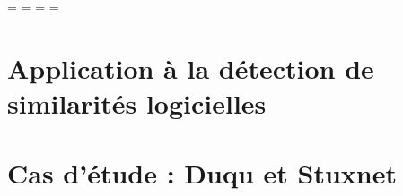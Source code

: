 
\usepackage[disable]{todonotes}


\OddHead={{\leftmark\rightmark}{\hfil\slshape\rightmark}}
\EvenHead={{\leftmark}{{\slshape\leftmark}\hfil}}
\OddFoot={\hfil\thepage}
\EvenFoot={\thepage\hfil}
\pagestyle{ThesisHeadingsII}

\mainmatter 

% 


\chapter{Application à la détection de similarités logicielles\label{chap:libs}}


\chapter{Cas d'étude : Duqu et Stuxnet\label{chap:duqu-stux}}

% 
% 
% 
\printbibliography



